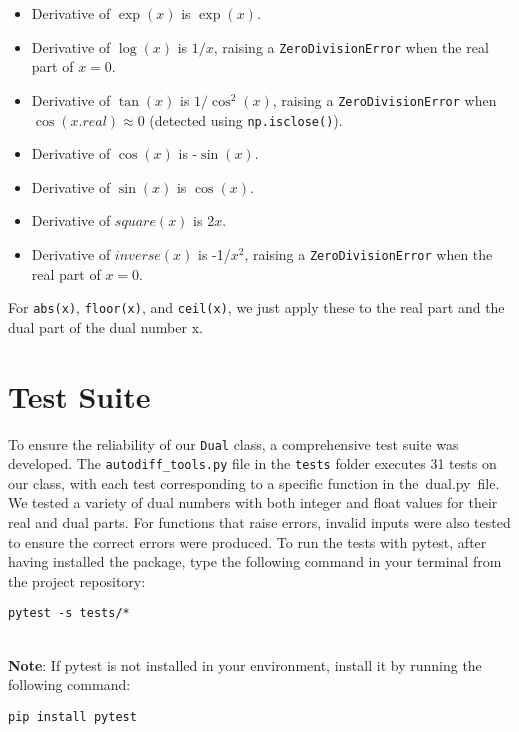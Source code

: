 \documentclass[a4paper,12pt]{article}
\begin{document}
\begin{itemize}
    \item Derivative of $\exp(x)$ is $\exp(x)$.
    \item Derivative of $\log(x)$ is $1/x$, raising a \texttt{ZeroDivisionError} when the real part of $x=0$.
    \item Derivative of $\tan(x)$ is $1/\cos^2(x)$, raising a \texttt{ZeroDivisionError} when $\cos(x.real) \approx 0$ (detected using \texttt{np.isclose()}).
    \item Derivative of $\cos(x)$ is -$\sin(x)$.
    \item Derivative of $\sin(x)$ is $\cos(x)$.
    \item Derivative of $square(x)$ is 2$x$.
    \item Derivative of $inverse(x)$ is -1/$x^2$, raising a \texttt{ZeroDivisionError} when the real part of $x=0$.


\end{itemize}

For \texttt{abs(x)}, \texttt{floor(x)}, and \texttt{ceil(x)}, we just apply these to the real part and the dual part of the dual number x.

\section{Test Suite}
To ensure the reliability of our \texttt{Dual} class, a comprehensive test suite was developed. 
The \texttt{autodiff\_tools.py} file in the \texttt{tests} folder executes 31 tests on our class, with each test corresponding to a specific function in the dual.py file. We tested a variety of dual numbers with both integer and float values for their real and dual parts. For functions that raise errors, invalid inputs were also tested to ensure the correct errors were produced.
To run the tests with pytest, after having installed the package, type the following command in your terminal from the project repository:

\begin{verbatim}
pytest -s tests/*
\end{verbatim}
\\

\textbf{Note}: If pytest is not installed in your environment, install it by running the following command:
\begin{verbatim}
pip install pytest
\end{verbatim}
\\
\end{document}
